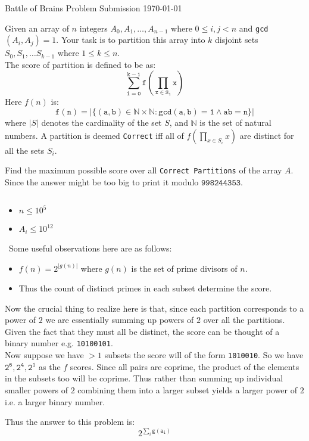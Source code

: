 \documentclass[12pt]{article}
\newenvironment{ex}[2][Problem]{\begin{trivlist}
		\item[\hskip \labelsep {\bfseries #1}\hskip \labelsep {\bfseries #2.}]}{\end{trivlist}}
\newenvironment{sol}[1][Solution]{\begin{trivlist}
		\item[\hskip \labelsep {\bfseries #1:}]}{\end{trivlist}}
\newenvironment{con}[1][Constraints]{\begin{trivlist}
		\item[\hskip \labelsep {\bfseries #1:}]}{\end{trivlist}}
\begin{document}
	
	\noindent Battle of Brains Problem Submission \hfill {} \hfill \today
	
	\begin{ex}{Name TBD} 
		Given an array of $n$ integers $A_0, A_1, \dots, A_{n-1}$ where $0 \leq i, j < n$ and \texttt{gcd}$(A_i, A_j) = 1$. Your task is to partition this array into $k$ disjoint sets $S_0, S_1, \dots S_{k - 1}$ where $1 \leq k \leq n$. \\
		The score of partition is defined to be as:\\
		$$\mathtt{\sum_{i=0}^{k-1}f(\prod_{x \in S_i}x)}$$
		Here $f(n)$ is:
		$$
		\mathtt{
		f(n) = \left|\{(a, b) \in \mathbb{N} \times \mathbb{N} : \texttt{gcd}(a, b) = 1 \wedge ab = n\}\right|}
		$$
		where $|S|$ denotes the cardinality of the set $S$, and $\mathbb{N}$ is the set of natural numbers.
		A partition is deemed \texttt{Correct} iff all of $f(\prod_{x \in S_i}x)$ are distinct for all the sets $S_i$.
		
		Find the maximum possible score over all \texttt{Correct Partitions} of the array $A$. Since the answer might be too big to print it modulo $\mathtt{998244353}$.
	\end{ex}
	
	\begin{con}
		$$$$
		\begin{itemize}
			\item $n \leq 10^5$
			\item $A_i \leq 10^{12}$
		\end{itemize}
	\end{con}
	
	\begin{sol}\
		Some useful observations here are as follows:
		\begin{itemize}
			\item $f(n) = 2^{|g(n)|}$ where $g(n)$ is the set of prime divisors of $n$. 
			\item Thus the count of distinct primes in each subset determine the score.			
		\end{itemize}
		Now the crucial thing to realize here is that, since each partition corresponds to a power of $2$ we are essentially summing up powers of $2$ over all the partitions. Given the fact that they must all be distinct, the score can be thought of a binary number e.g. \texttt{10100101}.\\
		
		Now suppose we have $> 1$ subsets the score will of the form \texttt{1010010}. So we have $\mathtt{2^6, 2^4, 2^1}$ as the $f$ scores. Since all pairs are coprime, the product of the elements in the subsets too will be coprime. Thus rather than summing up individual smaller powers of $2$ combining them into a larger subset yields a larger power of $2$ i.e. a larger binary number.
		
		Thus the answer to this problem is:\Large
		$$2^{\sum_{i}\mathtt{g(a_i)}}$$

	\end{sol}
	
\end{document}
